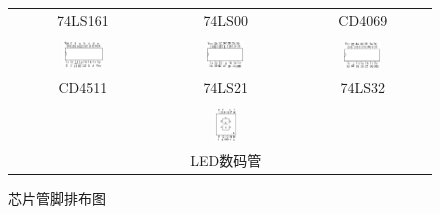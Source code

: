 \documentclass[12pt]{article}
\begin{document}
\begin{figure}[h]
\begin{tabular}{ccc}
74LS161&74LS00&CD4069\\
&&\\
\includegraphics[width=0.3\textwidth]{CD4511.png}&\includegraphics[width=0.3\textwidth]{7421.png}&\includegraphics[width=0.3\textwidth]{7432.png}\\
CD4511&74LS21&74LS32\\
&&\\
 & \includegraphics[width=0.18\textwidth]{LED.png} & \\
 &LED数码管&\\
  \end{tabular}
\caption{芯片管脚排布图}
  \label{fig:guanjiao}
\end{figure}
\end{document}
